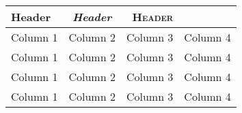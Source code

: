 \begin{table}
	\centering
	\begin{tabular}{ l c r p{2cm} }
		\toprule
		\textbf{Header} & \textit{Header} & \textsc{Header}\\
		\midrule
		Column 1 & Column 2 & Column 3 & Column 4\\
		 Column 1 & Column 2 & Column 3 & Column 4\\
		Column 1 & Column 2 & Column 3 & Column 4\\
		Column 1 & Column 2 & Column 3 & Column 4\\
		\bottomrule
	\end{tabular}

\end{table}


